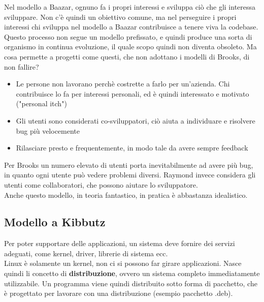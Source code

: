 \documentclass[a4paper,12pt]{article}
\begin{document}
Nel modello a Baazar, ognuno fa i propri interessi e sviluppa ciò che gli interessa sviluppare. Non c'è quindi un obiettivo comune, ma nel perseguire i propri interessi chi sviluppa nel modello a Baazar contribuisce a tenere viva la codebase. Questo processo non segue un modello prefissato, e quindi produce una sorta di organismo in continua evoluzione, il quale scopo quindi non diventa obsoleto.
Ma cosa permette a progetti come questi, che non adottano i modelli di Brooks, di non fallire?
\begin{itemize}
 \item Le persone non lavorano perchè costrette a farlo per un'azienda. Chi contribuisce lo fa per interessi personali, ed è quindi interessato e motivato ("personal itch")
 \item Gli utenti sono considerati co-sviluppatori, ciò aiuta a individuare e risolvere bug più velocemente
 \item Rilasciare presto e frequentemente, in modo tale da avere sempre feedback
\end{itemize}


Per Brooks un numero elevato di utenti porta inevitabilmente ad avere più bug, in quanto ogni utente può vedere problemi diversi. Raymond invece considera gli utenti come collaboratori, che possono aiutare lo sviluppatore.\\
Anche questo modello, in teoria fantastico, in pratica è abbastanza idealistico.

\subsection{Modello a Kibbutz}
Per poter supportare delle applicazioni, un sistema deve fornire dei servizi adeguati, come kernel, driver, librerie di sistema ecc.\\
Linux è solamente un kernel, non ci si possono far girare applicazioni. Nasce quindi li concetto di \textbf{distribuzione}, ovvero un sistema completo immediatamente utilizzabile. Un programma viene quindi distribuito sotto forma di pacchetto, che è progettato per lavorare con una distribuzione (esempio pacchetto .deb).

\end{document}
